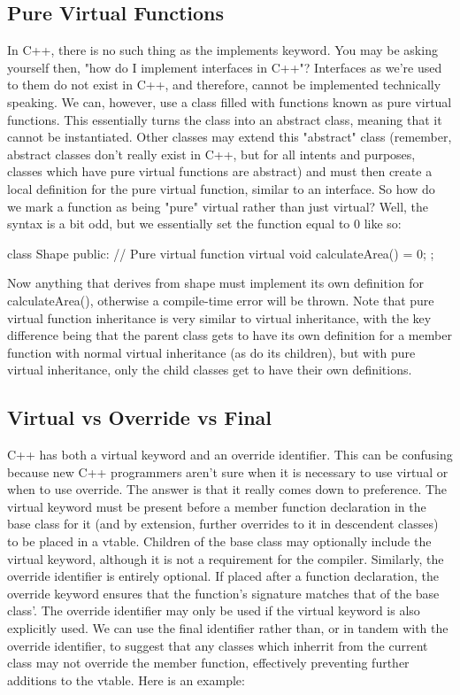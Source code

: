 \documentclass{article}
\begin{document}
\subsection{Pure Virtual Functions}

In C++, there is no such thing as the implements keyword. You may be asking yourself then, "how do I implement
interfaces in C++"? Interfaces as we’re used to them do not exist in C++, and therefore, cannot be implemented
technically speaking. We can, however, use a class filled with functions known as pure virtual functions. This
essentially turns the class into an abstract class, meaning that it cannot be instantiated. Other classes may
extend this "abstract" class (remember, abstract classes don't really exist in C++, but for all intents and
purposes, classes which have pure virtual functions are abstract) and must then create a local definition for
the pure virtual function, similar to an interface. So how do we mark a function as being "pure" virtual
rather than just virtual? Well, the syntax is a bit odd, but we essentially set the function equal to 0 like
so:

\begin{cpplst}
class Shape
{
public:
    // Pure virtual function
	virtual void calculateArea() = 0;
};
\end{cpplst}

Now anything that derives from shape must implement its own definition for calculateArea(), otherwise a
compile-time error will be thrown. Note that pure virtual function inheritance is very similar to virtual
inheritance, with the key difference being that the parent class gets to have its own definition for a member
function with normal virtual inheritance (as do its children), but with pure virtual inheritance, only the
child classes get to have their own definitions.

\subsection{Virtual vs Override vs Final}

C++ has both a virtual keyword and an override identifier. This can be confusing because new C++ programmers
aren't sure when it is necessary to use virtual or when to use override. The answer is that it really comes
down to preference. The virtual keyword must be present before a member function declaration in the base class
for it (and by extension, further overrides to it in descendent classes) to be placed in a vtable. Children of
the base class may optionally include the virtual keyword, although it is not a requirement for the compiler.
Similarly, the override identifier is entirely optional. If placed after a function declaration, the override
keyword ensures that the function's signature matches that of the base class'. The override identifier may only
be used if the virtual keyword is also explicitly used. We can use the final identifier rather than, or in
tandem with the override identifier, to suggest that any classes which inherrit from the current class may not
override the member function, effectively preventing further additions to the vtable. Here is an example:
\end{document}
